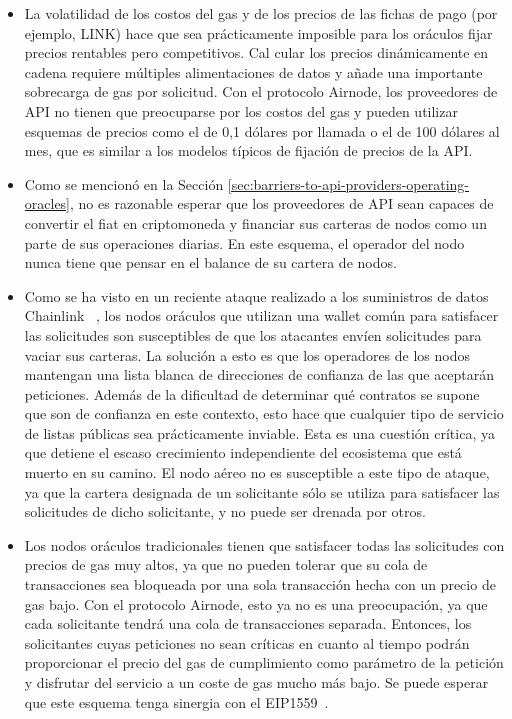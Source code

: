 \documentclass[11pt]{article}
\begin{document}
\begin{itemize}
    \item La volatilidad de los costos del gas y de los precios de las fichas de pago (por ejemplo, LINK) hace que sea prácticamente imposible para los oráculos fijar precios rentables pero competitivos. Cal cular los precios dinámicamente en cadena requiere múltiples alimentaciones de datos y añade una importante sobrecarga de gas por solicitud. Con el protocolo Airnode, los proveedores de API no tienen que preocuparse por los costos del gas y pueden utilizar esquemas de precios como el de 0,1 dólares por llamada o el de 100 dólares al mes, que es similar a los modelos típicos de fijación de precios de la API.
    \item Como se mencionó en la Sección \ref{sec:barriers-to-api-providers-operating-oracles}, no es razonable esperar que los proveedores de API sean capaces de convertir el fiat en criptomoneda y financiar sus carteras de nodos como un parte de sus operaciones diarias. En este esquema, el operador del nodo nunca tiene que pensar en el balance de su cartera de nodos.
    \item Como se ha visto en un reciente ataque realizado a los suministros de datos Chainlink ~\cite{chainlink-gastoken}, los nodos oráculos que utilizan una wallet común para satisfacer las solicitudes son susceptibles de que los atacantes envíen solicitudes para vaciar sus carteras. La solución a esto es que los operadores de los nodos mantengan una lista blanca de direcciones de confianza de las que aceptarán peticiones. Además de la dificultad de determinar qué contratos se supone que son de confianza en este contexto, esto hace que cualquier tipo de servicio de listas públicas sea prácticamente inviable. Esta es una cuestión crítica, ya que detiene el escaso crecimiento independiente del ecosistema que está muerto en su camino. El nodo aéreo no es susceptible a este tipo de ataque, ya que la cartera designada de un solicitante sólo se utiliza para satisfacer las solicitudes de dicho solicitante, y no puede ser drenada por otros.
    \item Los nodos oráculos tradicionales tienen que satisfacer todas las solicitudes con precios de gas muy altos, ya que no pueden tolerar que su cola de transacciones sea bloqueada por una sola transacción hecha con un precio de gas bajo. Con el protocolo Airnode, esto ya no es una preocupación, ya que cada solicitante tendrá una cola de transacciones separada. Entonces, los solicitantes cuyas peticiones no sean críticas en cuanto al tiempo podrán proporcionar el precio del gas de cumplimiento como parámetro de la petición y disfrutar del servicio a un coste de gas mucho más bajo. Se puede esperar que este esquema tenga sinergia con el EIP1559~\cite{eip1559}.
\end{itemize}
\end{document}

